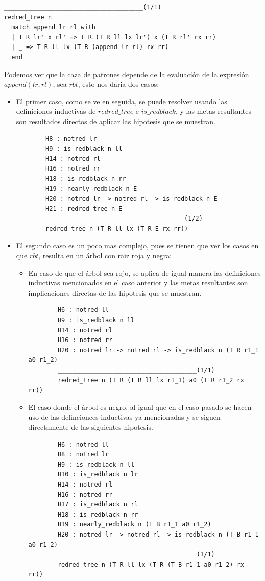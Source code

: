 \documentclass[8pt,leqno,pdflatex,spanish]{book}
\theoremstyle{plain}
\theoremstyle{definition}
\theoremstyle{remark}
\begin{document}
\begin{verbatim}
______________________________________(1/1)
redred_tree n
  match append lr rl with
  | T R lr' x rl' => T R (T R ll lx lr') x (T R rl' rx rr)
  | _ => T R ll lx (T R (append lr rl) rx rr)
  end
\end{verbatim}

Podemos ver que la caza de patrones depende de la evaluaci\'on de la expresi\'on $append(lr,rl)$, 
sea $rbt$, esto nos daria dos casos:

\begin{itemize}
    \item El primer caso, como se ve en seguida, se puede resolver usando las definiciones 
    inductivas de $redred\_tree$ e $is\_redblack$, y las metas resultantes son resultados directos 
    de aplicar las hipotesis que se muestran.
    \begin{verbatim}
        H8 : notred lr
        H9 : is_redblack n ll
        H14 : notred rl
        H16 : notred rr
        H18 : is_redblack n rr
        H19 : nearly_redblack n E
        H20 : notred lr -> notred rl -> is_redblack n E
        H21 : redred_tree n E
        ______________________________________(1/2)
        redred_tree n (T R ll lx (T R E rx rr))
    \end{verbatim}
    \item El segundo caso es un poco mas complejo, pues se tienen que ver los casos en que $rbt$, 
    resulta en un \'arbol con raiz roja y negra:
    \begin{itemize}
        \item En caso de que el \'arbol sea rojo, se aplica de igual manera las definiciones 
        inductivas mencionados en el caso anterior y las metas resultantes son implicaciones 
        directas de las hipotesis que se muestran.
        \begin{verbatim}
        H6 : notred ll
        H9 : is_redblack n ll
        H14 : notred rl
        H16 : notred rr
        H20 : notred lr -> notred rl -> is_redblack n (T R r1_1 a0 r1_2)
        ______________________________________(1/1)
        redred_tree n (T R (T R ll lx r1_1) a0 (T R r1_2 rx rr))
        \end{verbatim}
        \item El caso donde el \'arbol es negro, al igual que en el caso pasado se hacen uso de 
        las defincionces inductivas ya mencionadas y se siguen directamente de las siguientes 
        hipotesis.
        \begin{verbatim}
        H6 : notred ll
        H8 : notred lr
        H9 : is_redblack n ll
        H10 : is_redblack n lr
        H14 : notred rl
        H16 : notred rr
        H17 : is_redblack n rl
        H18 : is_redblack n rr
        H19 : nearly_redblack n (T B r1_1 a0 r1_2)
        H20 : notred lr -> notred rl -> is_redblack n (T B r1_1 a0 r1_2)
        ______________________________________(1/1)
        redred_tree n (T R ll lx (T R (T B r1_1 a0 r1_2) rx rr))
        \end{verbatim}
    \end{itemize}
\end{itemize}
\end{document}
